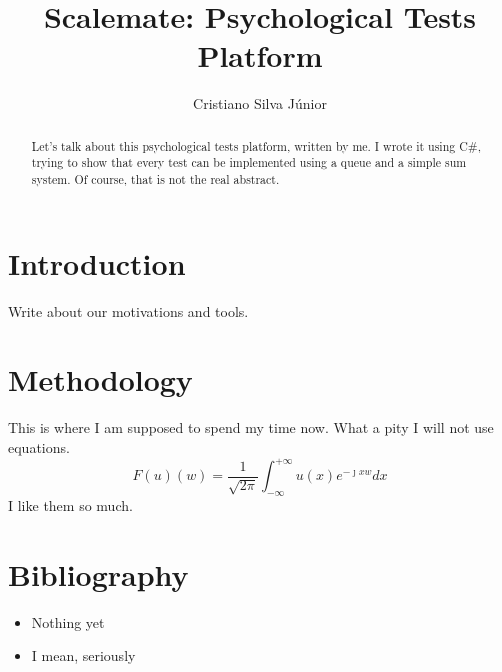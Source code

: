 \documentclass[12pt, a4paper, twoside]{article}
\begin{document}
\title{Scalemate: Psychological Tests Platform}
\author{Cristiano Silva Júnior}
\date{}
\maketitle

\begin{abstract}
Let's talk about this psychological tests platform, written by me. I wrote it
using C\#, trying to show that every test can be implemented using a queue
and a simple sum system. Of course, that is not the real abstract. 
\end{abstract}

\section{Introduction}

Write about our motivations and tools.

\section{Methodology}

This is where I am supposed to spend my time now. What a pity I will not use
equations.
$$F(u)(w) = \frac{1}{\sqrt{2\pi}} \int_{-\infty}^{+\infty} u(x)e^{-\jmath x w} dx$$
I like them so much.

\section{Bibliography}

\begin{itemize}
	\item Nothing yet
	\item I mean, seriously
\end{itemize}
\end{document}
